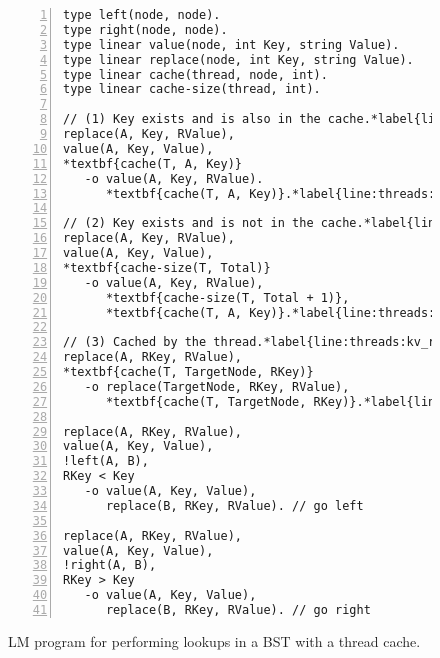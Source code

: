 \begin{figure}[ht]
\begin{Verbatim}[numbers=left,fontsize=\codesize,commandchars=*\{\}]
type left(node, node).
type right(node, node).
type linear value(node, int Key, string Value).
type linear replace(node, int Key, string Value).
type linear cache(thread, node, int).
type linear cache-size(thread, int).

// (1) Key exists and is also in the cache.*label{line:threads:kv_rule1_start}
replace(A, Key, RValue),
value(A, Key, Value),
*textbf{cache(T, A, Key)}
   -o value(A, Key, RValue).
      *textbf{cache(T, A, Key)}.*label{line:threads:kv_rule1_end}

// (2) Key exists and is not in the cache.*label{line:threads:kv_rule2_start}
replace(A, Key, RValue),
value(A, Key, Value),
*textbf{cache-size(T, Total)}
   -o value(A, Key, RValue),
      *textbf{cache-size(T, Total + 1)},
      *textbf{cache(T, A, Key)}.*label{line:threads:kv_rule2_end}

// (3) Cached by the thread.*label{line:threads:kv_rule3_start}
replace(A, RKey, RValue),
*textbf{cache(T, TargetNode, RKey)}
   -o replace(TargetNode, RKey, RValue),
      *textbf{cache(T, TargetNode, RKey)}.*label{line:threads:kv_rule3_end}

replace(A, RKey, RValue),
value(A, Key, Value),
!left(A, B),
RKey < Key
   -o value(A, Key, Value),
      replace(B, RKey, RValue). // go left

replace(A, RKey, RValue),
value(A, Key, Value),
!right(A, B),
RKey > Key
   -o value(A, Key, Value),
      replace(B, RKey, RValue). // go right
\end{Verbatim}
\caption{LM program for performing lookups in a BST with a thread cache.}
\label{code:threads:btree_lookup_cache}
\end{figure}
